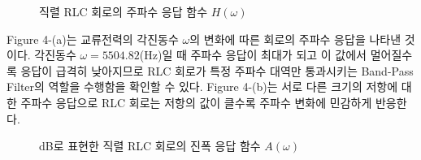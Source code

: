 \documentclass{article}
\begin{document}
\begin{figure}[h]
    \centering
    \caption{직렬 RLC 회로의 주파수 응답 함수 $H(\omega)$}
\end{figure}

Figure 4-(a)는 교류전력의 각진동수 $\omega$의 변화에 따른 회로의 주파수 응답을 나타낸 것이다. 각진동수 $\omega=5504.82$(Hz)일 때 주파수 응답이 최대가 되고 이 값에서 멀어질수록 응답이 급격히 낮아지므로 RLC 회로가 특정 주파수 대역만 통과시키는 Band-Pass Filter의 역할을 수행함을 확인할 수 있다. Figure 4-(b)는 서로 다른 크기의 저항에 대한 주파수 응답으로 RLC 회로는 저항의 값이 클수록 주파수 변화에 민감하게 반응한다.

\begin{figure}[h]
    \centering
    \caption{dB로 표현한 직렬 RLC 회로의 진폭 응답 함수 $A(\omega)$}
\end{figure}
\end{document}
